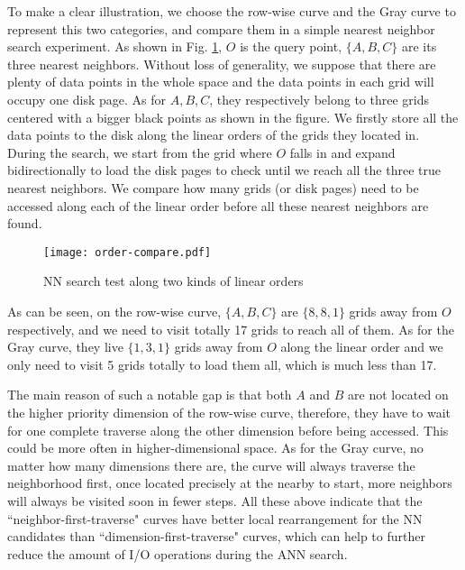 \documentclass[twocolumn]{svjour3}          %
\begin{document}
To make a clear illustration, we choose the row-wise curve and the Gray curve to represent this two categories, and compare them in a simple nearest neighbor search experiment. As shown in Fig. \ref{fig:nncompare}, $O$ is the query point, $\{A, B, C\}$ are its three nearest neighbors. Without loss of generality, we suppose that there are plenty of data points in the whole space and the data points in each grid will occupy one disk page. As for $A, B, C$, they respectively belong to three grids centered with a bigger black points as shown in the figure. We firstly store all the data points to the disk along the linear orders of the grids they located in. During the search, we start from the grid where $O$ falls in and expand bidirectionally to load the disk pages to check until we reach all the three true nearest neighbors. We compare how many grids (or disk pages) need to be accessed along each of the linear order before all these nearest neighbors are found.
\begin{figure}
  \centering
  \texttt{[image: order-compare.pdf]}\\
  \caption{NN search test along two kinds of linear orders}\label{fig:nncompare}
\end{figure}

As can be seen, on the row-wise curve, $\{A, B, C\}$ are $\{8, 8, 1\}$ grids away from $O$ respectively, and we need to visit totally 17 grids to reach all of them. As for the Gray curve, they live $\{1, 3, 1\}$ grids away from $O$ along the linear order and we only need to visit 5 grids totally to load them all, which is much less than 17.

The main reason of such a notable gap is that both $A$ and $B$ are not located on the higher priority dimension of the row-wise curve, therefore, they have to wait for one complete traverse along the other dimension before being accessed. This could be more often in higher-dimensional space. As for the Gray curve, no matter how many dimensions there are, the curve will always traverse the neighborhood first, once located precisely at the nearby to start, more neighbors will always be visited soon in fewer steps. All these above indicate that the ``neighbor-first-traverse" curves have better local rearrangement for the NN candidates than ``dimension-first-traverse" curves, which can help to further reduce the amount of I/O operations during the ANN search.
\end{document}
